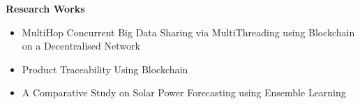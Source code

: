 \colorbox{titleColor}{\parbox{6.7in}{\textbf{Research Works}}}
\vspace{-2pt}
\begin{itemize}
    \addtolength{\itemindent}{0.4cm}
    \setlength{\itemsep}{.00pt}
    \item MultiHop Concurrent Big Data Sharing via MultiThreading using Blockchain on a Decentralised Network
    \item Product Traceability Using Blockchain
    \item A Comparative Study on Solar Power Forecasting using Ensemble Learning
\end{itemize}